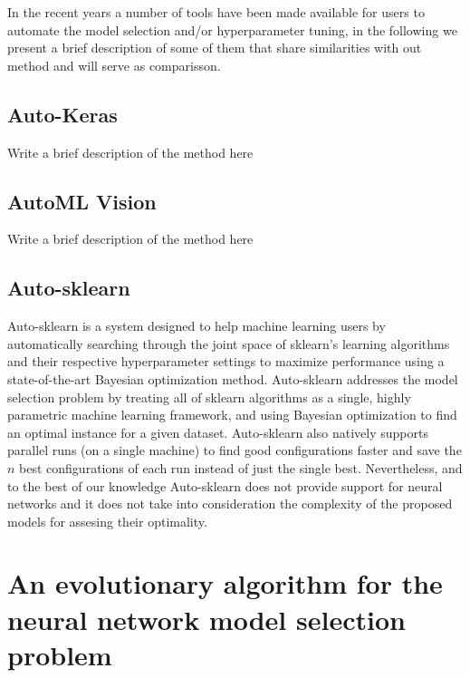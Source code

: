 \documentclass[journal]{IEEEtran}
\begin{document}

In the recent years a number of tools have been made available for users to automate the model selection and/or hyperparameter tuning, in the following we present a brief description of some of them that share similarities with out method and will serve as comparisson.

\subsection{Auto-Keras}

Write a brief description of the method here

\subsection{AutoML Vision}

Write a brief description of the method here

\subsection{Auto-sklearn}

Auto-sklearn \cite{Feurer2015} is a system designed to help machine learning users by automatically searching through the joint space of sklearn's learning algorithms and their respective hyperparameter settings to maximize performance using a state-of-the-art Bayesian optimization method. Auto-sklearn addresses the model selection problem by treating all of sklearn algorithms as a single, highly parametric machine learning framework, and using Bayesian optimization to find an optimal instance for a given dataset. Auto-sklearn also natively supports parallel runs (on a single machine) to find good configurations faster and save the $n$ best configurations of each run instead of just the single best. Nevertheless, and to the best of our knowledge Auto-sklearn does not provide support for neural networks and it does not take into consideration the complexity of the proposed models for assesing their optimality.


\section{An evolutionary algorithm for the neural network model selection problem }
\label{sec:auto_nn}
\end{document}
